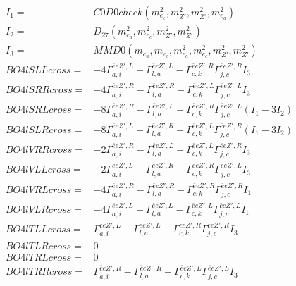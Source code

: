 \documentclass[A4,landscape]{article}
\begin{document}
\begin{align} 
I_1 = & C0D0check(m^2_{e_{{c}}}, m^2_{{Z'}}, m^2_{{Z'}}, m^2_{e_{{a}}}) \\ 
I_2 = & D_{27}(m^2_{e_{{a}}}, m^2_{e_{{c}}}, m^2_{{Z'}}, m^2_{{Z'}}) \\ 
I_3 = & MMD0(m_{e_{{a}}}, m_{e_{{c}}}, m^2_{e_{{a}}}, m^2_{e_{{c}}}, m^2_{{Z'}}, m^2_{{Z'}}) \\ 
  BO4lSLLcross= & -4  \Gamma^{\bar{e}e {Z'} ,L}_{a, i} - \Gamma^{\bar{e}e {Z'} ,L} _{l, a} - \Gamma^{\bar{e}e {Z'} ,R} _{c, k} \Gamma^{\bar{e}e {Z'} ,R}_{j, c} I_3 \\ 
  BO4lSRRcross= & -4  \Gamma^{\bar{e}e {Z'} ,R}_{a, i} - \Gamma^{\bar{e}e {Z'} ,R} _{l, a} - \Gamma^{\bar{e}e {Z'} ,L} _{c, k} \Gamma^{\bar{e}e {Z'} ,L}_{j, c} I_3 \\ 
  BO4lSRLcross= & -8  \Gamma^{\bar{e}e {Z'} ,R}_{a, i} - \Gamma^{\bar{e}e {Z'} ,L} _{l, a} - \Gamma^{\bar{e}e {Z'} ,R} _{c, k} \Gamma^{\bar{e}e {Z'} ,L}_{j, c} (I_1 - 3 I_2) \\ 
  BO4lSLRcross= & -8  \Gamma^{\bar{e}e {Z'} ,L}_{a, i} - \Gamma^{\bar{e}e {Z'} ,R} _{l, a} - \Gamma^{\bar{e}e {Z'} ,L} _{c, k} \Gamma^{\bar{e}e {Z'} ,R}_{j, c} (I_1 - 3 I_2) \\ 
  BO4lVRRcross= & -2  \Gamma^{\bar{e}e {Z'} ,R}_{a, i} - \Gamma^{\bar{e}e {Z'} ,L} _{l, a} - \Gamma^{\bar{e}e {Z'} ,L} _{c, k} \Gamma^{\bar{e}e {Z'} ,R}_{j, c} I_3 \\ 
  BO4lVLLcross= & -2  \Gamma^{\bar{e}e {Z'} ,L}_{a, i} - \Gamma^{\bar{e}e {Z'} ,R} _{l, a} - \Gamma^{\bar{e}e {Z'} ,R} _{c, k} \Gamma^{\bar{e}e {Z'} ,L}_{j, c} I_3 \\ 
  BO4lVRLcross= & -4  \Gamma^{\bar{e}e {Z'} ,R}_{a, i} - \Gamma^{\bar{e}e {Z'} ,R} _{l, a} - \Gamma^{\bar{e}e {Z'} ,R} _{c, k} \Gamma^{\bar{e}e {Z'} ,R}_{j, c} I_1 \\ 
  BO4lVLRcross= & -4  \Gamma^{\bar{e}e {Z'} ,L}_{a, i} - \Gamma^{\bar{e}e {Z'} ,L} _{l, a} - \Gamma^{\bar{e}e {Z'} ,L} _{c, k} \Gamma^{\bar{e}e {Z'} ,L}_{j, c} I_1 \\ 
  BO4lTLLcross= &  \Gamma^{\bar{e}e {Z'} ,L}_{a, i} - \Gamma^{\bar{e}e {Z'} ,L} _{l, a} - \Gamma^{\bar{e}e {Z'} ,R} _{c, k} \Gamma^{\bar{e}e {Z'} ,R}_{j, c} I_3 \\ 
  BO4lTLRcross= & 0 \\ 
  BO4lTRLcross= & 0 \\ 
  BO4lTRRcross= &  \Gamma^{\bar{e}e {Z'} ,R}_{a, i} - \Gamma^{\bar{e}e {Z'} ,R} _{l, a} - \Gamma^{\bar{e}e {Z'} ,L} _{c, k} \Gamma^{\bar{e}e {Z'} ,L}_{j, c} I_3 \\ 
\end{align} 
\end{document}
